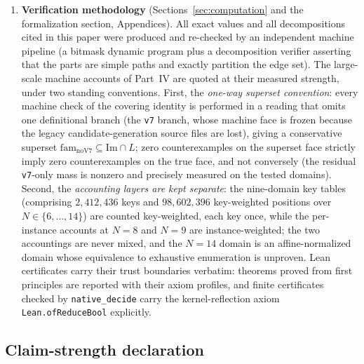 \begin{enumerate}[label=(\roman*),leftmargin=2em]
\item \textbf{Verification methodology} (Sections~\ref{sec:computation} and the formalization
section, Appendices). All exact values and all decompositions cited in this paper were produced and
re-checked by an independent machine pipeline (a bitmask dynamic program plus a
decomposition verifier asserting that the parts are simple paths and exactly partition the
edge set). The large-scale machine accounts of Part~IV are quoted at their measured
strength, under two standing conventions. First, the \emph{one-way superset convention}:
every machine check of the covering identity is performed in a reading that omits one
definitional branch (the \texttt{v7} branch, whose machine face is frozen because the
legacy candidate-generation source files are lost), giving a conservative superset
$\mathrm{fam}_{\mathrm{noV7}}\subseteq\mathrm{Im}\cap L$; zero counterexamples on the
superset face strictly imply zero counterexamples on the true face, and not conversely (the
residual \texttt{v7}-only mass is nonzero and precisely measured on the tested domains).
Second, the \emph{accounting layers are kept separate}: the nine-domain key tables
(comprising $2{,}412{,}436$ keys and $98{,}602{,}396$ key-weighted positions over
$N\in\{6,\dots,14\}$) are counted key-weighted, each key once, while the per-instance
accounts at $N=8$ and $N=9$ are instance-weighted; the two accountings are never mixed, and
the $N=14$ domain is an affine-normalized domain whose equivalence to exhaustive enumeration
is unproven. Lean certificates carry their trust boundaries verbatim: theorems proved from
first principles are reported with their axiom profiles, and finite certificates checked by
\texttt{native\_decide} carry the kernel-reflection axiom \texttt{Lean.ofReduceBool}
explicitly.
\end{enumerate}

\subsection{Claim-strength declaration}\label{int:subsec-claims}

